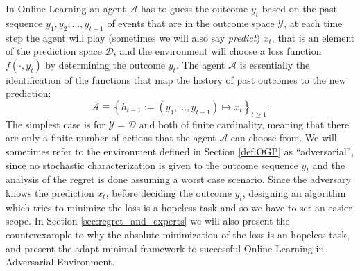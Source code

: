 In Online Learning an agent $\mathcal A$ has to guess the outcome $y_t$ based on the past sequence $y_1,y_2,\ldots,y_{t-1}$ of events that are in the outcome space $\mathcal Y$, at each time step the agent will play (sometimes we will also say \emph{predict}) $x_t$, that is an element of the prediction space $\mathcal D$, and the environment will choose a loss function $f(\cdot,y_t)$ by determining the outcome $y_t$.
The agent $\mathcal A$ is essentially the identification of the functions that map the history of past outcomes to the new prediction:
$$\mathcal A\equiv\left\{h_{t-1}:=(y_1,\ldots,y_{t-1})\longmapsto x_t\right\}_{t\ge 1}. $$
The simplest case is for $\mathcal Y=\mathcal D$ and both of finite cardinality, meaning that there are only a finite number of actions that the agent $\mathcal A$ can choose from. 
We will sometimes refer to the environment defined in Section \ref{def:OGP} as ``adversarial'', since no stochastic characterization is given to the outcome sequence $y_t$ and the analysis of the regret is done assuming a worst case scenario.
Since the adversary knows the prediction $x_t$, before deciding the outcome $y_t$, designing an algorithm which tries to minimize the loss is a hopeless task and so we have to set an easier scope. In Section \ref{sec:regret_and_experts} we will also present the counterexample to why the absolute minimization of the loss is an hopeless task, and present the adapt minimal framework to successful Online Learning in Adversarial Environment.




